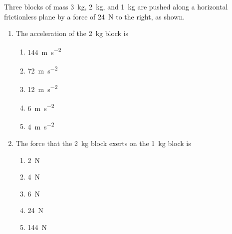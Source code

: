 \documentclass{../../oss-apphys}
\begin{document}
\begin{multicols}{2}
  Three blocks of mass \SI{3}{\kilo\gram}, \SI{2}{\kilo\gram}, and
  \SI{1}{\kilo\gram} are pushed along a horizontal frictionless plane by a
  force of \SI{24}{\newton} to the right, as shown.
  \begin{center}
  \end{center}
  \begin{enumerate}[resume,leftmargin=18pt]
  \item The acceleration of the \SI{2}{\kilo\gram} block is
    \begin{enumerate}[noitemsep,topsep=0pt,leftmargin=18pt,label=(\Alph*)]
    \item\SI{144}{\metre\per\second^2}
    \item\SI{72 }{\metre\per\second^2}
    \item\SI{12 }{\metre\per\second^2}
    \item\SI{6  }{\metre\per\second^2}
    \item\SI{4  }{\metre\per\second^2}
    \end{enumerate}

  \item The force that the \SI{2}{\kilo\gram} block exerts on the
    \SI{1}{\kilo\gram} block is
    \begin{enumerate}[noitemsep,topsep=0pt,leftmargin=18pt,label=(\Alph*)]
    \item \SI{2}{\newton}
    \item \SI{4}{\newton}
    \item \SI{6}{\newton}
    \item \SI{24}{\newton}
    \item \SI{144}{\newton}
    \end{enumerate}

    \columnbreak
    

\end{enumerate}
\end{multicols}
\end{document}
